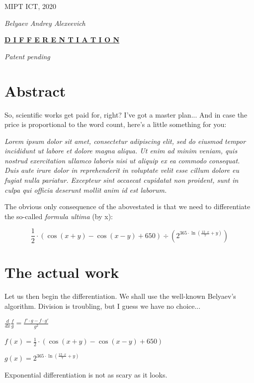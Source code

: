 \documentclass[12pt]{article}
\begin{document}
\begin{fleqn}[\parindent]
\begin{titlepage}\begin{center}\Large MIPT ICT, 2020\end{center}\begin{center}\Large\textit{Belyaev Andrey Alexeevich}\end{center}\begin{center}\Huge\textbf{\underline{D I F F E R E N T I A T I O N}}\end{center}\begin{center}\large\textit{Patent pending}\end{center}\section{\Large{Abstract}}
So, scientific works get paid for, right? I've got a master plan... 
And in case the price is proportional to the word count, here's a little something for you:\par
\textit{Lorem ipsum dolor sit amet, consectetur adipiscing elit, sed do eiusmod tempor incididunt ut labore et dolore magna aliqua. Ut enim ad minim veniam, quis nostrud exercitation ullamco laboris nisi ut aliquip ex ea commodo consequat. Duis aute irure dolor in reprehenderit in voluptate velit esse cillum dolore eu fugiat nulla pariatur. Excepteur sint occaecat cupidatat non proident, sunt in culpa qui officia deserunt mollit anim id est laborum.}\par
The obvious only consequence of the abovestated is that we need to differentiate the so-called \textit{formula ultima} (by x): \par
$$ \frac{ 1 }{ 2 } \cdot (\cos ( x  +  y ) - \cos ( x  -  y ) +  650 ) \div ({ 2 }^{ 365  \cdot \ln (\frac{ 12  \cdot  x }{ 7 } +  y )}) $$

\end{titlepage}

\section{\Large{The actual work}}

Let us then begin the differentiation. We shall use the well-known Belyaev's algorithm.
Division is troubling, but I guess we have no choice...\par
$ \frac{d}{dx} \frac{f}{g} = \frac{f' \cdot g - f \cdot g'}{g^2} $\par
$ f(x) = \frac{ 1 }{ 2 } \cdot (\cos ( x  +  y ) - \cos ( x  -  y ) +  650 ) $\par
$ g(x) = { 2 }^{ 365  \cdot \ln (\frac{ 12  \cdot  x }{ 7 } +  y )} $\par
Exponential differentiation is not as scary as it looks.


\end{fleqn}
\end{document}
